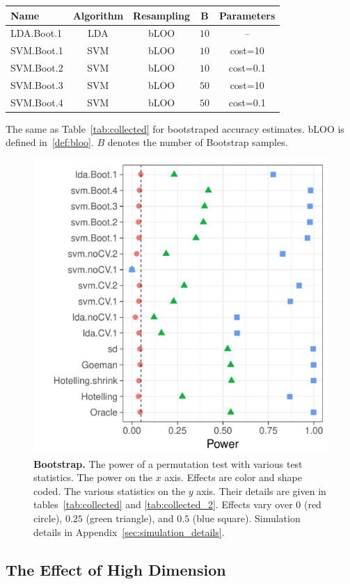 \documentclass[12pt,a4paper]{article}
\begin{document}
\bigskip

\begin{tcolorbox}
	\centering
	\begin{tabular}{l|c|c|c|c}
		Name & Algorithm & Resampling & B  & Parameters\\ 
		\hline
		\hline
		LDA.Boot.1 & LDA & bLOO 	& $10$ &  -- \\ 
		SVM.Boot.1 & SVM & bLOO 	& $10$ & cost=10 \\ 
		SVM.Boot.2 & SVM & bLOO 	& $10$ & cost=0.1 \\ 
		SVM.Boot.3 & SVM & bLOO 	& $50$ & cost=10 \\ 
		SVM.Boot.4 & SVM & bLOO 	& $50$ & cost=0.1 \\ 
	\end{tabular} 
	\captionsetup{type=table}
	\caption{
		The same as Table~\ref{tab:collected} for bootstraped accuracy estimates. 
		bLOO is defined in~\ref{def:bloo}.
		$B$ denotes the number of Bootstrap samples.} 
	\label{tab:collected_2}
\end{tcolorbox}


\begin{figure}[ht]
	\centering
	\includegraphics[width=0.5\linewidth]{"art/file13"}
	\caption{
		\textbf{Bootstrap.}
		The power of a permutation test with various test statistics. 
		The power on the $x$ axis. 
		Effects are color and shape coded. 
		The various statistics on the $y$ axis. 
		Their details are given in tables~\ref{tab:collected} and \ref{tab:collected_2}. 
		Effects vary over $0$ (red circle), $0.25$ (green triangle), and $0.5$ (blue square). 
		Simulation details in Appendix~\ref{sec:simulation_details}.
	} 
	\label{fig:bootstrap}
\end{figure}






\subsection{The Effect of High Dimension}
\label{sec:highdim}
\end{document}
